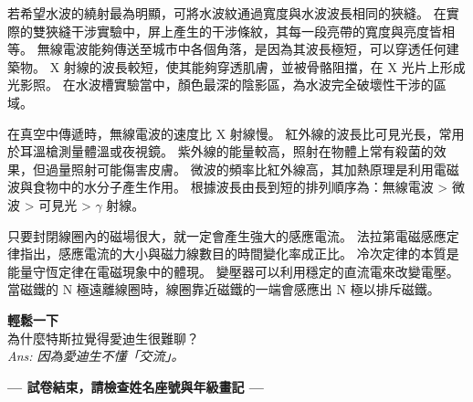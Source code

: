 \documentclass[10pt,a4paper]{article}
\begin{document}
{若希望水波的繞射最為明顯，可將水波紋通過寬度與水波波長相同的狹縫。}
{在實際的雙狹縫干涉實驗中，屏上產生的干涉條紋，其每一段亮帶的寬度與亮度皆相等。}
{無線電波能夠傳送至城市中各個角落，是因為其波長極短，可以穿透任何建築物。}
{X 射線的波長較短，使其能夠穿透肌膚，並被骨骼阻擋，在 X 光片上形成光影照。}
{在水波槽實驗當中，顏色最深的陰影區，為水波完全破壞性干涉的區域。}

{在真空中傳遞時，無線電波的速度比 X 射線慢。}
{紅外線的波長比可見光長，常用於耳溫槍測量體溫或夜視鏡。}
{紫外線的能量較高，照射在物體上常有殺菌的效果，但過量照射可能傷害皮膚。}
{微波的頻率比紅外線高，其加熱原理是利用電磁波與食物中的水分子產生作用。}
{根據波長由長到短的排列順序為：無線電波 > 微波 > 可見光 > $\gamma$ 射線。}

{只要封閉線圈內的磁場很大，就一定會產生強大的感應電流。}
{法拉第電磁感應定律指出，感應電流的大小與磁力線數目的時間變化率成正比。}
{冷次定律的本質是能量守恆定律在電磁現象中的體現。}
{變壓器可以利用穩定的直流電來改變電壓。}
{當磁鐵的 N 極遠離線圈時，線圈靠近磁鐵的一端會感應出 N 極以排斥磁鐵。}

\vfill
\begin{center}
    \begin{tcolorbox}[colframe=lightgray, colback=white, halign=center, width=0.8\textwidth, arc=2mm]
        \small \textbf{輕鬆一下} \\
        為什麼特斯拉覺得愛迪生很難聊？ \\
        \textit{Ans: 因為愛迪生不懂「交流」。}
    \end{tcolorbox}
\end{center}

\begin{center}
    \large \textbf{--- 試卷結束，請檢查姓名座號與年級畫記 ---}
\end{center}
\end{document}
